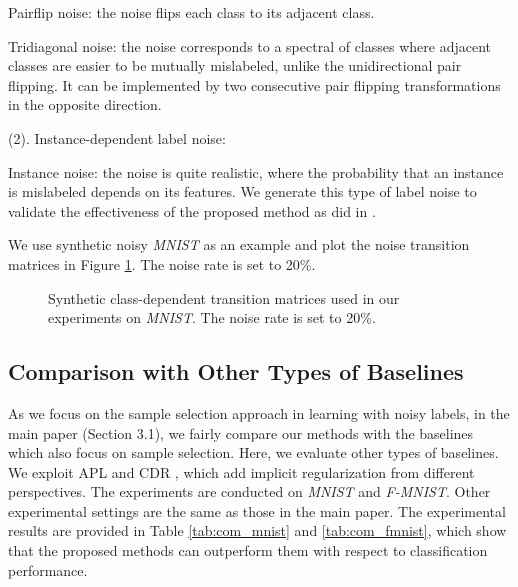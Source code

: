 \documentclass[11pt]{article}
\begin{document}
 Pairflip noise: the noise flips each class to its adjacent class. 

 Tridiagonal noise: the noise corresponds to a spectral of classes where adjacent classes are easier to be mutually mislabeled, unlike the unidirectional pair flipping. It can be implemented by two consecutive pair flipping transformations in the opposite direction.

(2). Instance-dependent label noise: 

 Instance noise: the noise is quite realistic, where the probability that an instance is mislabeled depends on its features. We generate this type of label noise to validate the effectiveness of the proposed method as did in \cite{xia2020part}.

We use synthetic noisy \textit{MNIST} as an example and plot the noise transition matrices in Figure \ref{fig:matrix}. The noise rate is set to 20\%.
\begin{figure}[!t]
\centering
{}\caption{Synthetic class-dependent transition matrices used in our experiments on \textit{MNIST}. The noise rate is set to 20\%.}
\label{fig:matrix}
\end{figure}

\subsection{Comparison with Other Types of Baselines}
As we focus on the sample selection approach in learning with noisy labels, in the main paper (Section 3.1), we fairly compare our methods with the baselines which also focus on sample selection. Here, we evaluate other types of baselines. We exploit APL \cite{ma2020normalized} and CDR \cite{xia2021robust}, which add implicit regularization from different perspectives. The experiments are conducted on \textit{MNIST} and \textit{F-MNIST}. Other experimental settings are the same as those in the main paper. The experimental results are provided in Table \ref{tab:com_mnist} and \ref{tab:com_fmnist}, which show that the proposed methods can outperform them with respect to classification performance. 
\end{document}
